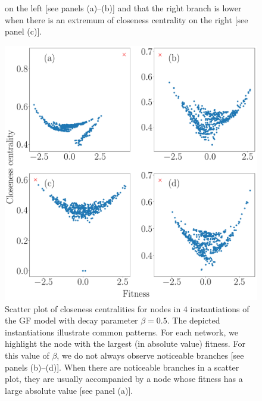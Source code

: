 \documentclass[%
 reprint,
 amsmath,amssymb,
 aps,
]{revtex4-1}
\begin{document}
\begin{figure}
{    %
    on the left [see panels (a)--(b)] and that the right branch is lower when 
   there is an extremum of closeness centrality
    on the right [see panel (c)]. 
    }
    \label{fig:closeness_example}
\end{figure}


\begin{figure}
    \centering
    \includegraphics[width=0.8\linewidth]{geographic_beta_05_examples_largerfont.pdf}
    \caption{Scatter plot of closeness centralities for nodes in $4$ instantiations of the GF model with decay parameter $\beta = 0.5$. The depicted instantiations illustrate common patterns. For each network, we highlight the node with the largest (in absolute value) fitness. For this value of $\beta$, we do not always observe noticeable branches [see panels (b)--(d)]. When there are noticeable branches in a scatter plot, they are usually accompanied by a node whose fitness has a large absolute value [see panel (a)].
    }
    \label{fig:closeness_example_2}
\end{figure}
\end{document}
